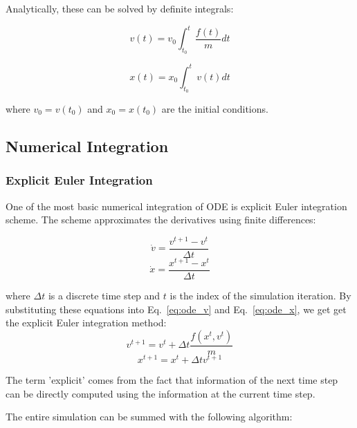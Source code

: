 \documentclass[en]{minipw} %
\begin{document}
Analytically, these can be solved by definite integrals:

\begin{equation}
\label{eq:ode_anal1}
v(t) = v_0 \int_{t_0}^{t} \dfrac{f(t)}{m} dt
\end{equation}

\begin{equation}
\label{eq:ode_anal2}
x(t) = x_0 \int_{t_0}^{t}v(t) dt
\end{equation}

where $v_0 = v(t_0)$ and $x_0 = x(t_0)$ are the initial conditions.

\subsection{Numerical Integration}

\subsubsection{Explicit Euler Integration}

One of the most basic numerical integration of ODE is explicit Euler integration scheme. The scheme approximates the derivatives using finite differences:

\begin{equation}
\dot{v} = \dfrac{v^{t+1} - v^{t}}{\Delta t}
\end{equation}
\begin{equation}
\dot{x} = \dfrac{x^{t+1} - x^{t}}{\Delta t}
\end{equation}

where $\Delta t$ is a discrete time step and $t$ is the index of the simulation iteration. By substituting these equations into Eq.~\ref{eq:ode_v} and Eq.~\ref{eq:ode_x}, we get get the explicit Euler integration method:
\begin{equation}
\label{eq:explicit_euler_ode_v}
v^{t+1} = v^{t} + \Delta t \dfrac{f(x^{t}, v^{t})}{m}
\end{equation}
\begin{equation}
\label{eq:explicit_euler_ode_x}
x^{t+1} = x^{t} + \Delta t v^{t+1}
\end{equation}

The term 'explicit' comes from the fact that information of the next time step can be directly computed using the information at the current time step.

The entire simulation can be summed with the following algorithm:
\end{document}
